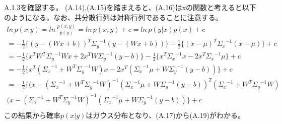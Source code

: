 \documentclass{jsarticle}
\begin{document}
A.1.3を確認する。
(A.14),(A.15)を踏まえると、(A.16)はxの関数と考えると以下のようになる。なお、共分散行列は対称行列であることに注意する。
\begin{equation}
\begin{split}
ln \, p(x|y) = ln \, \frac{p(x,y)}{p(y)} = ln \, p(x,y) + c = ln \, p(y|x)p(x) + c\\
=-\frac{1}{2}\{ (y - (Wx + b))^T {\Sigma_y}^{-1}(y - (Wx + b))\} -\frac{1}{2}\{ (x - \mu)^T {\Sigma_x}^{-1}(x - \mu)\} + c\\
=-\frac{1}{2}\{ x^T W^T {\Sigma_y}^{-1} W x + 2x^T W {\Sigma_y}^{-1} (y - b) \} -\frac{1}{2}\{ x^T {\Sigma_x}^{-1} x - 2 x^T {\Sigma_x}^{-1}\mu \} + c\\
=-\frac{1}{2}\{ x^T ({\Sigma_x}^{-1} + W^T {\Sigma_y}^{-1}W) x - 2 x^T ({\Sigma_x}^{-1}\mu + W {\Sigma_y}^{-1} (y - b)) \} + c\\
=-\frac{1}{2}\{ (x - ({\Sigma_x}^{-1} + W^T {\Sigma_y}^{-1}W)^{-1}({\Sigma_x}^{-1}\mu + W {\Sigma_y}^{-1} (y - b))^T ({\Sigma_x}^{-1} + W^T {\Sigma_y}^{-1}W) \\
(x - ({\Sigma_x}^{-1} + W^T {\Sigma_y}^{-1}W)^{-1}({\Sigma_x}^{-1}\mu + W {\Sigma_y}^{-1} (y - b)) \} + c\\
\end{split}
\end{equation}
この結果から確率$p(x|y)$はガウス分布となり、(A.17)から(A.19)がわかる。
\end{document}
